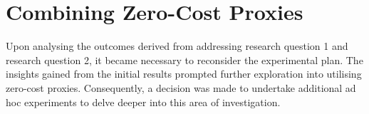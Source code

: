 \section{Combining Zero-Cost Proxies}

Upon analysing the outcomes derived from addressing research question 1 and research question 2, it became necessary to reconsider the experimental plan. The insights gained from the initial results prompted further exploration into utilising zero-cost proxies. Consequently, a decision was made to undertake additional ad hoc experiments to delve deeper into this area of investigation.




